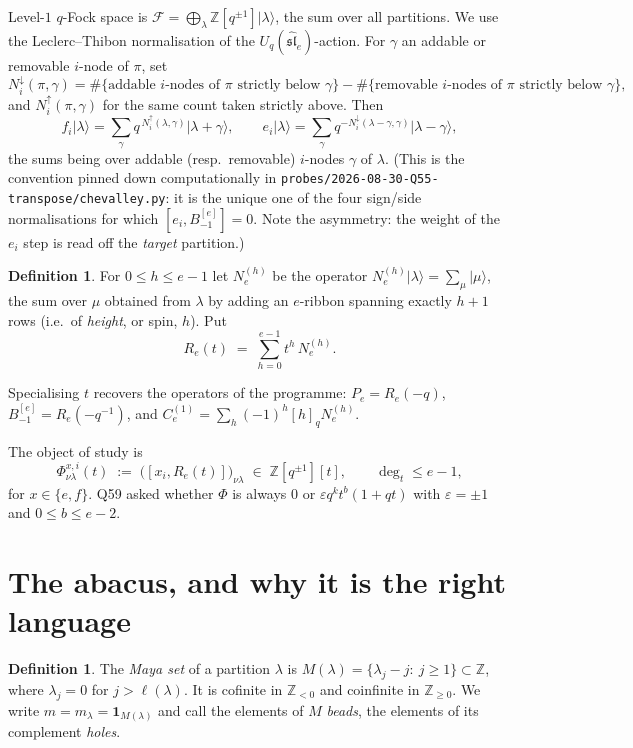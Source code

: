 \documentclass[11pt]{article}
\theoremstyle{plain}
\theoremstyle{definition}
\newtheorem{definition}[theorem]{Definition}
\newcommand{\F}{\mathcal{F}}
\newcommand{\Z}{\mathbb{Z}}
\newcommand{\ket}[1]{\lvert #1\rangle}
\newcommand{\Nb}{N^{\downarrow}}
\newcommand{\Na}{N^{\uparrow}}
\begin{document}
Level-$1$ $q$-Fock space is $\F=\bigoplus_\lambda \Z[q^{\pm1}]\ket{\lambda}$,
the sum over all partitions. We use the Leclerc--Thibon normalisation of the
$U_q(\widehat{\mathfrak{sl}}_e)$-action. For $\gamma$ an addable or removable
$i$-node of $\pi$, set
\[
\Nb_i(\pi,\gamma)=\#\{\text{addable $i$-nodes of $\pi$ strictly below }\gamma\}
-\#\{\text{removable $i$-nodes of $\pi$ strictly below }\gamma\},
\]
and $\Na_i(\pi,\gamma)$ for the same count taken strictly above. Then
\begin{equation}\label{eq:chev}
f_i\ket{\lambda}=\sum_{\gamma}q^{\,\Na_i(\lambda,\gamma)}\ket{\lambda+\gamma},
\qquad
e_i\ket{\lambda}=\sum_{\gamma}q^{-\Nb_i(\lambda-\gamma,\gamma)}\ket{\lambda-\gamma},
\end{equation}
the sums being over addable (resp.\ removable) $i$-nodes $\gamma$ of $\lambda$.
(This is the convention pinned down computationally in
\texttt{probes/2026-08-30-Q55-transpose/chevalley.py}: it is the unique one of the
four sign/side normalisations for which $[e_i,B^{[e]}_{-1}]=0$. Note the asymmetry:
the weight of the $e_i$ step is read off the \emph{target} partition.)

\begin{definition}
For $0\le h\le e-1$ let $N_e^{(h)}$ be the operator
$N_e^{(h)}\ket{\lambda}=\sum_\mu\ket{\mu}$, the sum over $\mu$ obtained from
$\lambda$ by adding an $e$-ribbon spanning exactly $h+1$ rows (i.e.\ of
\emph{height}, or spin, $h$). Put
\[
R_e(t)\;=\;\sum_{h=0}^{e-1}t^h\,N_e^{(h)} .
\]
\end{definition}

Specialising $t$ recovers the operators of the programme:
$P_e=R_e(-q)$, $B^{[e]}_{-1}=R_e(-q^{-1})$, and
$C^{(1)}_e=\sum_h(-1)^h[h]_q N_e^{(h)}$.

The object of study is
\[
\Phi^{x,i}_{\nu\lambda}(t)\;:=\;\big([x_i,R_e(t)]\big)_{\nu\lambda}
\;\in\;\Z[q^{\pm1}][t],\qquad \deg_t\le e-1,
\]
for $x\in\{e,f\}$. Q59 asked whether $\Phi$ is always $0$ or
$\varepsilon q^kt^b(1+qt)$ with $\varepsilon=\pm1$ and $0\le b\le e-2$.

\section{The abacus, and why it is the right language}

\begin{definition}
The \emph{Maya set} of a partition $\lambda$ is
$M(\lambda)=\{\lambda_j-j:\ j\ge1\}\subset\Z$, where $\lambda_j=0$ for
$j>\ell(\lambda)$. It is cofinite in $\Z_{<0}$ and coinfinite in $\Z_{\ge0}$.
We write $m=m_\lambda=\mathbf 1_{M(\lambda)}$ and call the elements of $M$
\emph{beads}, the elements of its complement \emph{holes}.
\end{definition}
\end{document}
